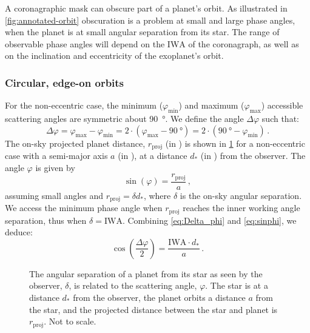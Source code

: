 \documentclass[usenatbib]{mnras}
\newcommand{\IWA}{\ensuremath{\mathrm{IWA}}\xspace}
\begin{document}
A coronagraphic mask can obscure part of a planet's orbit. As illustrated in \cref{fig:annotated-orbit} obscuration is a problem at small and large phase angles, when the planet is at small angular separation from its star.
The range of observable phase angles will depend on the \IWA of the coronagraph, as well as on the inclination and eccentricity of the exoplanet's orbit.

\subsubsection{Circular, edge-on orbits}

For the non-eccentric case, 
the minimum ($\varphi_\mathrm{min}$) and maximum ($\varphi_\mathrm{max}$) accessible scattering angles are symmetric about \qty{90}{\degree}. 
We define the angle $\Delta \varphi$ such that: 
\begin{equation}
    \label{eq:Delta_phi}
    \Delta \varphi 
    = \varphi_\mathrm{max} - \varphi_\mathrm{min}
    =  2 \cdot (\varphi_\mathrm{max} - \qty{90}{\degree}) 
    =  2 \cdot (\qty{90}{\degree} - \varphi_\mathrm{min} )  \,.
\end{equation} 
The on-sky projected planet distance, $r_\mathrm{proj}$ (in \unit{\au}) is shown in \cref{fig:scattering-angle} for a non-eccentric case with a 
semi-major axis $a$ (in \unit{\au}), at a distance $d_*$ (in \unit{\parsec}) from the observer. 
The angle $\varphi$ is given by
\begin{equation}
    \label{eq:sinphi}
    \sin(\varphi) = \frac{r_\mathrm{proj}}{a} \,,
\end{equation}
assuming small angles and $r_\mathrm{proj} = \delta d_*$, where $\delta$ is the on-sky angular separation.
We access the minimum phase angle when $r_\mathrm{proj}$ reaches the inner working angle separation, thus when $\delta = \mathrm{IWA}$. 
Combining \cref{eq:Delta_phi} and \cref{eq:sinphi}, we deduce:
\begin{equation}
    \label{eq:scattering_angle}
    \cos\left(\dfrac{\Delta \varphi}{2}\right) = \frac{\mathrm{IWA} 
    \cdot d_*}{a} \,.
\end{equation}

\begin{figure}
    \centering
    
    \caption{
        The angular separation of a planet from its star as seen by the observer, $\delta$, is related to the scattering angle, $\varphi$. The star is at a distance $d_*$ from the observer, the planet orbits a distance $a$ from the star, and  the projected distance between the star and planet is  $r_\mathrm{proj}$. Not to scale. 
    }
    \label{fig:scattering-angle}
\end{figure}
\end{document}
